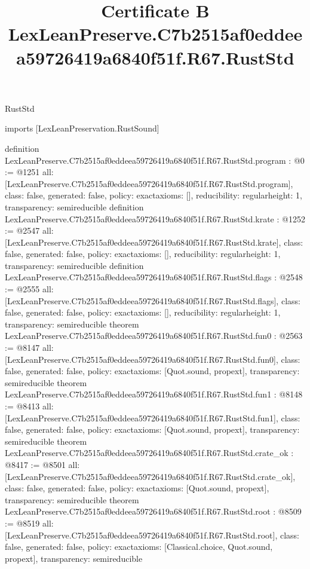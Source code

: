 \begin{lexlean}{RustStd}
\title{Certificate B LexLeanPreserve.C7b2515af0eddeea59726419a6840f51f.R67.RustStd}
\begin{coremodule}
imports [LexLeanPreservation.RustSound]

definition LexLeanPreserve.C7b2515af0eddeea59726419a6840f51f.R67.RustStd.program : @0 := @1251 {
  all: [LexLeanPreserve.C7b2515af0eddeea59726419a6840f51f.R67.RustStd.program],
  class: false,
  generated: false,
  policy: exact{axioms: []},
  reducibility: regular{height: 1},
  transparency: semireducible
}
definition LexLeanPreserve.C7b2515af0eddeea59726419a6840f51f.R67.RustStd.krate : @1252 := @2547 {
  all: [LexLeanPreserve.C7b2515af0eddeea59726419a6840f51f.R67.RustStd.krate],
  class: false,
  generated: false,
  policy: exact{axioms: []},
  reducibility: regular{height: 1},
  transparency: semireducible
}
definition LexLeanPreserve.C7b2515af0eddeea59726419a6840f51f.R67.RustStd.flags : @2548 := @2555 {
  all: [LexLeanPreserve.C7b2515af0eddeea59726419a6840f51f.R67.RustStd.flags],
  class: false,
  generated: false,
  policy: exact{axioms: []},
  reducibility: regular{height: 1},
  transparency: semireducible
}
theorem LexLeanPreserve.C7b2515af0eddeea59726419a6840f51f.R67.RustStd.fun0 : @2563 := @8147 {
  all: [LexLeanPreserve.C7b2515af0eddeea59726419a6840f51f.R67.RustStd.fun0],
  class: false,
  generated: false,
  policy: exact{axioms: [Quot.sound, propext]},
  transparency: semireducible
}
theorem LexLeanPreserve.C7b2515af0eddeea59726419a6840f51f.R67.RustStd.fun1 : @8148 := @8413 {
  all: [LexLeanPreserve.C7b2515af0eddeea59726419a6840f51f.R67.RustStd.fun1],
  class: false,
  generated: false,
  policy: exact{axioms: [Quot.sound, propext]},
  transparency: semireducible
}
theorem LexLeanPreserve.C7b2515af0eddeea59726419a6840f51f.R67.RustStd.crate_ok : @8417 := @8501 {
  all: [LexLeanPreserve.C7b2515af0eddeea59726419a6840f51f.R67.RustStd.crate_ok],
  class: false,
  generated: false,
  policy: exact{axioms: [Quot.sound, propext]},
  transparency: semireducible
}
theorem LexLeanPreserve.C7b2515af0eddeea59726419a6840f51f.R67.RustStd.root : @8509 := @8519 {
  all: [LexLeanPreserve.C7b2515af0eddeea59726419a6840f51f.R67.RustStd.root],
  class: false,
  generated: false,
  policy: exact{axioms: [Classical.choice, Quot.sound, propext]},
  transparency: semireducible
}


\end{coremodule}
\end{lexlean}

